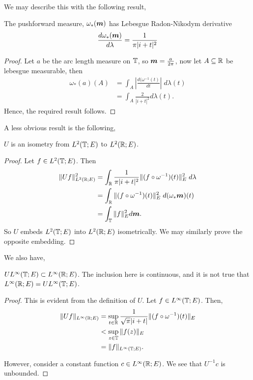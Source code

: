 We may describe this with the following result,
\begin{lemma}
    The pushforward measure, $\omega_*(\boldsymbol{m})$ has Lebesgue Radon-Nikodym 
    derivative
    \begin{equation*}
        \frac{d\omega_*(\boldsymbol{m})}{d\lambda} = \frac{1}{\pi|i+t|^2}
    \end{equation*}
\end{lemma}
\begin{proof}
    Let $a$ be the arc length measure on $\mathbb{T}$, so $\boldsymbol{m} = \frac{a}{2\pi}$, now
    let $A \subseteq \mathbb{R}$ be lebesgue measurable, then
    \begin{align*}
        \omega_*(a)(A) &= \int_A \left|\frac{d(\omega^{-1}(t)}{dt}\right|\;d\lambda(t)\\
        &= \int_A \frac{2}{|i+t|^2}d\lambda(t).
    \end{align*}
    Hence, the required result follows.
\end{proof}


A less obvious result is the following, 
\begin{theorem}
    $U$ is an isometry from $L^2(\mathbb{T};E)$ to $L^2(\mathbb{R};E)$. 
\end{theorem}
\begin{proof}
    Let $f \in L^2(\mathbb{T};E)$. Then
    \begin{align*}
        \|U f\|_{L^2(\mathbb{R};E)}^2 &= \int_{\mathbb{R}} \frac{1}{\pi|i+t|^2}\|(f\circ\omega^{-1})(t)\|_E^2\;d\lambda\\
        &= \int_{\mathbb{R}} \|(f\circ\omega^{-1})(t)\|_E^2\;d(\omega_*\boldsymbol{m})(t)\\
        &= \int_{\mathbb{T}} \|f\|_E^2 d\boldsymbol{m}.
    \end{align*}
    So $U$ embeds $L^2(\mathbb{T};E)$ into $L^2(\mathbb{R};E)$ isometrically.
    We may similarly prove the opposite embedding.
\end{proof}


We also have,
\begin{theorem}
    $U L^\infty(\mathbb{T};E) \subset L^\infty(\mathbb{R};E)$. The inclusion
    here is continuous, and it is not true that $L^\infty(\mathbb{R};E) = U L^\infty(\mathbb{T};E)$.
\end{theorem}
\begin{proof}
    This is evident from the definition of $U$. Let $f \in L^\infty(\mathbb{T};E)$. Then,
    \begin{align*}
        \|U f\|_{L^\infty(\mathbb{R};E)} &= \sup_{t \in \mathbb{R}} \frac{1}{\sqrt{\pi}|i+t|}\|(f\circ \omega^{-1})(t)\|_{E} \\
        &< \sup_{z \in \mathbb{T}} \|f(z)\|_E\\
        &= \|f\|_{L^\infty(\mathbb{T};E)}.
    \end{align*}
    
    However, consider a constant function $c \in L^\infty(\mathbb{R};E)$.
    We see that $U^{-1}c$ is unbounded.
\end{proof}

